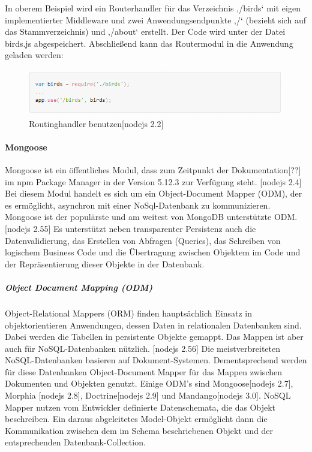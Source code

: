 In oberem Beispiel wird ein Routerhandler für das Verzeichnis ‚/birds‘ mit eigen implementierter Middleware und zwei Anwendungsendpunkte ‚/‘ (bezieht sich auf das Stammverzeichnis) und ‚/about‘ erstellt. Der Code wird unter der Datei birds.js abgespeichert. 
Abschließend kann das Routermodul in die Anwendung geladen werden: 
\newline

\begin{figure}[h]
\centering
\includegraphics[width=14cm]{images/nodejs_expressRouterbenutzen.PNG}
\caption{Routinghandler benutzen[nodejs 2.2]}
\end{figure}

\newpage
\paragraph{Mongoose}
Mongoose ist ein öffentliches Modul, dass zum Zeitpunkt der Dokumentation[??] im npm Package Manager in der Version 5.12.3 zur Verfügung steht. [nodejs 2.4] Bei diesem Modul handelt es sich um ein Object-Document Mapper (ODM), der es ermöglicht, asynchron mit einer NoSql-Datenbank zu kommunizieren. Mongoose ist der populärste und am weitest von MongoDB unterstützte ODM. [nodejs 2.55] Es unterstützt neben transparenter Persistenz auch die Datenvalidierung, das Erstellen von Abfragen (Queries), das Schreiben von logischem Business Code und die Übertragung zwischen Objektem im Code und der Repräsentierung dieser Objekte in der Datenbank.
\newline

\subparagraph{Object Document Mapping (ODM)}
Object-Relational Mappers (ORM) finden hauptsächlich Einsatz in objektorientieren Anwendungen, dessen Daten in relationalen Datenbanken sind. Dabei werden die Tabellen in persistente Objekte gemappt.
Das Mappen ist aber auch für NoSQL-Datenbanken nützlich. [nodejs 2.56] Die meistverbreiteten NoSQL-Datenbanken basieren auf Dokument-Systemen. Dementsprechend werden für diese Datenbanken Object-Document Mapper für das Mappen zwischen Dokumenten und Objekten genutzt. Einige ODM’s sind Mongoose[nodejs 2.7], Morphia [nodejs 2.8], Doctrine[nodejs 2.9] und Mandango[nodejs 3.0].
NoSQL Mapper nutzen vom Entwickler definierte Datenschemata, die das Objekt beschreiben. Ein daraus abgeleitetes Model-Objekt ermöglicht dann die Kommunikation zwischen dem im Schema beschriebenen Objekt und der entsprechenden Datenbank-Collection.
\newline

